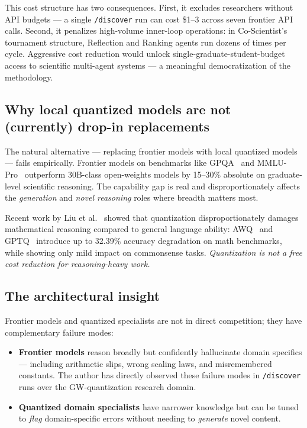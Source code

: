 \documentclass[11pt]{article}
\begin{document}
This cost structure has two consequences. First, it excludes researchers without API budgets --- a single \texttt{/discover} run can cost \$1--3 across seven frontier API calls. Second, it penalizes high-volume inner-loop operations: in Co-Scientist's tournament structure, Reflection and Ranking agents run dozens of times per cycle. Aggressive cost reduction would unlock single-graduate-student-budget access to scientific multi-agent systems --- a meaningful democratization of the methodology.

\subsection{Why local quantized models are not (currently) drop-in replacements}

The natural alternative --- replacing frontier models with local quantized models --- fails empirically. Frontier models on benchmarks like GPQA~\cite{rein2023gpqa} and MMLU-Pro~\cite{wang2024mmlupro} outperform 30B-class open-weights models by 15--30\% absolute on graduate-level scientific reasoning. The capability gap is real and disproportionately affects the \emph{generation} and \emph{novel reasoning} roles where breadth matters most.

Recent work by Liu et al.~\cite{liu2025quantmeetsreasoning} showed that quantization disproportionately damages mathematical reasoning compared to general language ability: AWQ~\cite{lin2023awq} and GPTQ~\cite{frantar2022gptq} introduce up to 32.39\% accuracy degradation on math benchmarks, while showing only mild impact on commonsense tasks. \emph{Quantization is not a free cost reduction for reasoning-heavy work.}

\subsection{The architectural insight}

Frontier models and quantized specialists are not in direct competition; they have complementary failure modes:

\begin{itemize}
  \item \textbf{Frontier models} reason broadly but confidently hallucinate domain specifics --- including arithmetic slips, wrong scaling laws, and misremembered constants. The author has directly observed these failure modes in \texttt{/discover} runs over the GW-quantization research domain.
  \item \textbf{Quantized domain specialists} have narrower knowledge but can be tuned to \emph{flag} domain-specific errors without needing to \emph{generate} novel content.
\end{itemize}
\end{document}
